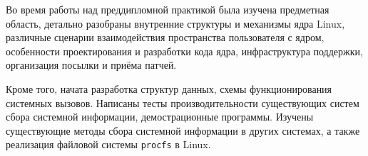 \label{sec:outro}

Во время работы над преддипломной практикой была изучена предметная область,
детально разобраны внутренние структуры и механизмы ядра Linux, различные
сценарии взаимодействия пространства пользователя с ядром, особенности
проектирования и разработки кода ядра, инфраструктура поддержки, организация
посылки и приёма патчей.

Кроме того, начата разработка структур данных, схемы функционирования системных
вызовов. Написаны тесты производительности существующих систем сбора системной
информации, демострационные программы. Изучены существующие методы сбора
системной информации в других системах, а также реализация файловой системы
\texttt{procfs} в Linux.
